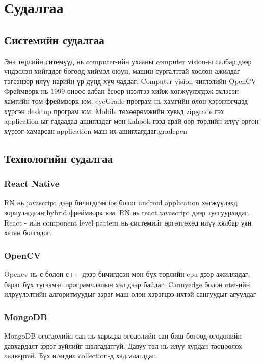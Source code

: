 


\newcommand{\keyword}[1]{\textbf{#1}}
\newcommand{\tabhead}[1]{\textbf{#1}}
\newcommand{\code}[1]{\texttt{#1}}
\newcommand{\file}[1]{\texttt{\bfseries#1}}
\newcommand{\option}[1]{\texttt{\itshape#1}}

\section{Судалгаа}	
\subsection{Системийн судалгаа}
	Энэ төрлийн ситемүүд нь computer-ийн ухааны computer vision-ы салбар дээр үндэслэн хийгддэг бөгөөд хиймэл оюун, машин сургалттай хослон ажилдаг тэгсэнээр илүү нарийн үр дүнд хүч чаддаг. Computer vision чиглэлийн OpenCV Фреймворк нь 1999 оноос албан ёсоор нээлтээ хийж хөгжүүлэгдэж эхлэсэн хамгийн том фреймворк юм. eyeGrade програм нь хамгийн олон хэрэглэгчдэд хүрсэн desktop програм юм. Mobile төхөөрөмжийн хувьд zipgrade гэх application-ыг гадаадад ашигладаг мөн kahook гээд арай өөр төрлийн илүү өргөн хүрээг хамарсан application маш их ашиглагддаг.gradepen
\subsection{Технологийн судалгаа}
	\subsubsection{React Native}
	RN нь javascript дээр бичигдсэн ios болог android application хөгжүүлэхд зориулагдсан hybrid фреймворк юм. RN нь react javascript дээр тулгуурладаг. React - ийн component level pattern нь системийг өргөтгөхөд илүү хялбар уян хатан болгодог.
	\subsubsection{OpenCV}
	Opencv нь с болон с++  дээр бичигдсэн мөн бүх төрлийн cpu-дээр ажилладаг, бараг бүх түгээмэл програмчлалын хэл дээр байдаг. Cannyedge болон otsi-ийн илрүүлэлтийн алгоритмуудыг зэрэг маш олон хэрэгцээ ихтэй сангуудыг агуулдаг
	\subsubsection{MongoDB}
	MongoDB өгөгдөлийн сан нь харьцаа өгөдөлийн сан биш бөгөөд өгөдөлийн давхардалт зэрэг зүйлийг шалгадаггүй. Давуу тал нь илүү хурдан тооцоолох чадвартай. Бүх өгөгдөл collection-д хадгалагддаг.
